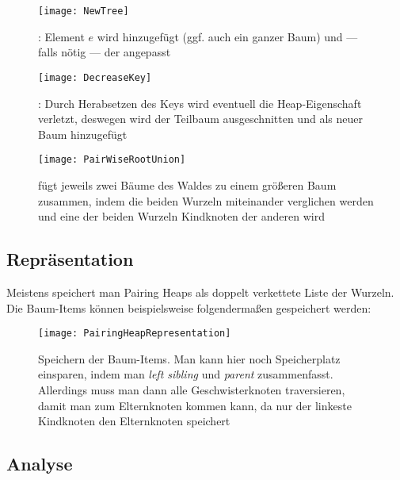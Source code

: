 \begin{minipage}{.475\textwidth}
  \begin{figure}[H]
    \texttt{[image: NewTree]}
    \caption{: Element \( e \) wird hinzugefügt (ggf. auch ein ganzer Baum) und --- falls nötig --- der  angepasst}
  \end{figure}
\end{minipage}
\hfill
\begin{minipage}{.475\textwidth}
  \vspace{1cm}
  \begin{figure}[H]
    \texttt{[image: DecreaseKey]}
    \caption{: Durch Herabsetzen des Keys wird eventuell die Heap-Eigenschaft verletzt, deswegen wird der Teilbaum ausgeschnitten und als neuer Baum hinzugefügt}
  \end{figure}
\end{minipage}

\begin{figure}[H]
  \texttt{[image: PairWiseRootUnion]}
  \caption{ fügt jeweils zwei Bäume des Waldes zu einem größeren Baum zusammen, indem die beiden Wurzeln miteinander verglichen werden und eine der beiden Wurzeln Kindknoten der anderen wird}
\end{figure}

\subsection{Repräsentation}

Meistens speichert man Pairing Heaps als doppelt verkettete Liste der Wurzeln. Die Baum-Items können beispielsweise folgendermaßen gespeichert werden:

\begin{figure}[H]
  \texttt{[image: PairingHeapRepresentation]}
  \caption{Speichern der Baum-Items. Man kann hier noch Speicherplatz einsparen, indem man \emph{left sibling} und \emph{parent} zusammenfasst. Allerdings muss man dann alle Geschwisterknoten traversieren, damit man zum Elternknoten kommen kann, da nur der linkeste Kindknoten den Elternknoten speichert}
\end{figure}

\subsection{Analyse}

